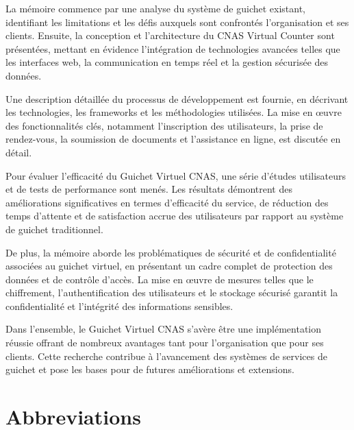 \documentclass[12pt]{report}
\begin{document}
            La mémoire commence par une analyse du système de guichet existant, identifiant les limitations et les défis auxquels sont confrontés l'organisation et ses clients. Ensuite, la conception et l'architecture du CNAS Virtual Counter sont présentées, mettant en évidence l'intégration de technologies avancées telles que les interfaces web, la communication en temps réel et la gestion sécurisée des données.
            
            Une description détaillée du processus de développement est fournie, en décrivant les technologies, les frameworks et les méthodologies utilisées. La mise en œuvre des fonctionnalités clés, notamment l'inscription des utilisateurs, la prise de rendez-vous, la soumission de documents et l'assistance en ligne, est discutée en détail.
            
            Pour évaluer l'efficacité du Guichet Virtuel CNAS, une série d'études utilisateurs et de tests de performance sont menés. Les résultats démontrent des améliorations significatives en termes d'efficacité du service, de réduction des temps d'attente et de satisfaction accrue des utilisateurs par rapport au système de guichet traditionnel.
            
            De plus, la mémoire aborde les problématiques de sécurité et de confidentialité associées au guichet virtuel, en présentant un cadre complet de protection des données et de contrôle d'accès. La mise en œuvre de mesures telles que le chiffrement, l'authentification des utilisateurs et le stockage sécurisé garantit la confidentialité et l'intégrité des informations sensibles.
            
            Dans l'ensemble, le Guichet Virtuel CNAS s'avère être une implémentation réussie offrant de nombreux avantages tant pour l'organisation que pour ses clients. Cette recherche contribue à l'avancement des systèmes de services de guichet et pose les bases pour de futures améliorations et extensions.
            \vspace*{\fill}
        \thispagestyle{empty}  
                    
\tableofcontents
\listoffigures
\listoftables


\chapter*{Abbreviations}
\end{document}

